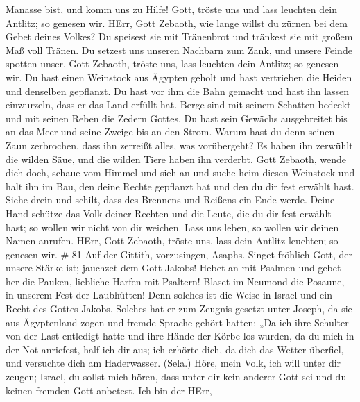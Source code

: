 Manasse bist, und komm uns zu Hilfe!  Gott, tröste uns und
lass leuchten dein Antlitz; so genesen wir.  HErr, Gott
Zebaoth, wie lange willst du zürnen bei dem Gebet deines Volkes?
 Du speisest sie mit Tränenbrot und tränkest sie mit großem
Maß voll Tränen.  Du setzest uns unseren Nachbarn zum Zank,
und unsere Feinde spotten unser.  Gott Zebaoth, tröste uns,
lass leuchten dein Antlitz; so genesen wir.  Du hast einen
Weinstock aus Ägypten geholt und hast vertrieben die Heiden und
denselben gepflanzt.  Du hast vor ihm die Bahn gemacht und
hast ihn lassen einwurzeln, dass er das Land erfüllt hat. 
Berge sind mit seinem Schatten bedeckt und mit seinen Reben die Zedern
Gottes.  Du hast sein Gewächs ausgebreitet bis an das Meer
und seine Zweige bis an den Strom.  Warum hast du denn
seinen Zaun zerbrochen, dass ihn zerreißt alles, was vorübergeht?
 Es haben ihn zerwühlt die wilden Säue, und die wilden
Tiere haben ihn verderbt.  Gott Zebaoth, wende dich doch,
schaue vom Himmel und sieh an und suche heim diesen Weinstock
 und halt ihn im Bau, den deine Rechte gepflanzt hat und
den du dir fest erwählt hast.  Siehe drein und schilt, dass
des Brennens und Reißens ein Ende werde.  Deine Hand
schütze das Volk deiner Rechten und die Leute, die du dir fest erwählt
hast;  so wollen wir nicht von dir weichen. Lass uns leben,
so wollen wir deinen Namen anrufen.  HErr, Gott Zebaoth,
tröste uns, lass dein Antlitz leuchten; so genesen wir. \# 81
 Auf der Gittith, vorzusingen, Asaphs.  Singet
fröhlich Gott, der unsere Stärke ist; jauchzet dem Gott Jakobs!
 Hebet an mit Psalmen und gebet her die Pauken, liebliche
Harfen mit Psaltern!  Blaset im Neumond die Posaune, in
unserem Fest der Laubhütten!  Denn solches ist die Weise in
Israel und ein Recht des Gottes Jakobs.  Solches hat er zum
Zeugnis gesetzt unter Joseph, da sie aus Ägyptenland zogen und fremde
Sprache gehört hatten:  „Da ich ihre Schulter von der Last
entledigt hatte und ihre Hände der Körbe los wurden,  da du
mich in der Not anriefest, half ich dir aus; ich erhörte dich, da dich
das Wetter überfiel, und versuchte dich am Haderwasser. (Sela.)
 Höre, mein Volk, ich will unter dir zeugen; Israel, du
sollst mich hören,  dass unter dir kein anderer Gott sei
und du keinen fremden Gott anbetest.  Ich bin der HErr,
